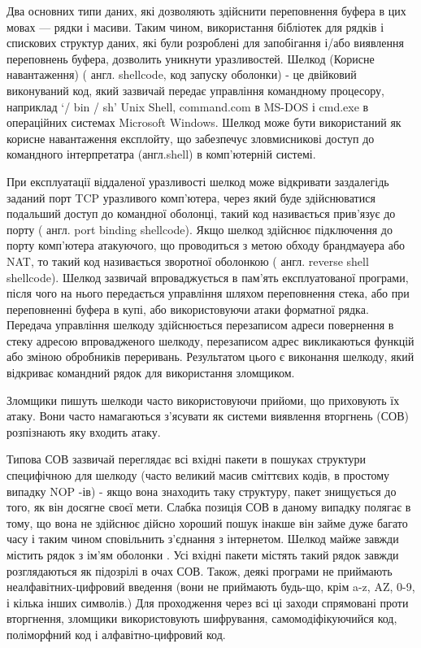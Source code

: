 
Два основних типи даних, які дозволяють здійснити переповнення буфера в цих мовах — рядки і масиви. Таким чином, використання бібліотек для рядків і спискових структур даних, які були розроблені для запобігання і/або виявлення переповнень буфера, дозволить уникнути уразливостей.
Шелкод (Корисне навантаження) ( англ. shellcode, код запуску оболонки) - це двійковий виконуваний код, який зазвичай передає управління командному процесору,  наприклад `/ bin / sh'  Unix Shell, command.com в MS-DOS і cmd.exe в операційних системах Microsoft Windows.  Шелкод може бути використаний як корисне навантаження експлойту, що забезпечує зловмисникові доступ до командного інтерпретатра (англ.shell) в комп'ютерній системі.

При експлуатації віддаленої уразливості шелкод може відкривати заздалегідь заданий порт TCP уразливого комп'ютера, через який буде здійснюватися подальший доступ до командної оболонці, такий код називається прив'язує до порту ( англ. port binding shellcode).  Якщо шелкод здійснює підключення до порту комп'ютера атакуючого, що проводиться з метою обходу брандмауера або NAT, то такий код називається зворотної оболонкою ( англ. reverse shell shellcode).
Шелкод зазвичай впроваджується в пам'ять експлуатованої програми, після чого на нього передається управління шляхом переповнення стека, або при переповненні буфера в купі, або використовуючи атаки форматної рядка.  Передача управління шелкоду здійснюється перезаписом адреси повернення в стеку адресою впровадженого шелкоду, перезаписом адрес викликаються функцій або зміною обробників переривань.  Результатом цього є виконання шелкоду, який відкриває командний рядок для використання зломщиком.

Зломщики пишуть шелкоди часто використовуючи прийоми, що приховують їх атаку.  Вони часто намагаються з'ясувати як системи виявлення вторгнень (СОВ) розпізнають яку входить атаку.  

Типова СОВ зазвичай переглядає всі вхідні пакети в пошуках структури специфічною для шелкоду (часто великий масив сміттєвих кодів, в простому випадку NOP -ів) -  якщо вона знаходить таку структуру, пакет знищується до того, як він досягне своєї мети.  Слабка позиція СОВ в даному випадку полягає в тому, що вона не здійснює дійсно хороший пошук інакше він займе дуже багато часу і таким чином сповільнить з'єднання з інтернетом. 
Шелкод майже завжди містить рядок з ім'ям оболонки .  Усі вхідні пакети містять такий рядок завжди розглядаються як підозрілі в очах СОВ.  Також, деякі програми не приймають неалфавітних-цифровий введення (вони не приймають будь-що, крім a-z, AZ, 0-9, і кілька інших символів.)
Для проходження через всі ці заходи спрямовані проти вторгнення, зломщики використовують шифрування, самомодіфікуючийся код, поліморфний код і алфавітно-цифровий код.


